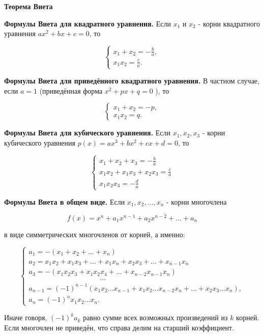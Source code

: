 \centerline{\bf \Huge Теорема Виета}


\textbf{Формулы Виета для квадратного уравнения.}
Если $x_1$ и $x_2$ - корни квадратного уравнения $a x^2+b x+c=0$, то

$$
\left\{\begin{array}{l}
x_1+x_2=-\frac{b}{a}, \\
x_1 x_2=\frac{c}{a} .
\end{array}\right.
$$


\textbf{Формулы Виета для приведённого квадратного уравнения.}
В частном случае, если $a=1$ (приведённая форма $x^2+p x+q=0$ ), то

$$
\left\{\begin{array}{l}
x_1+x_2=-p, \\
x_1 x_2=q .
\end{array}\right.
$$


\textbf{Формулы Виета для кубического уравнения.}
Если $x_1, x_2, x_3$ - корни кубического уравнения $p(x)=a x^3+b x^2+c x+d=0$, то

$$
\left\{\begin{array}{l}
x_1+x_2+x_3=-\frac{b}{a} \\
x_1 x_2+x_1 x_3+x_2 x_3=\frac{c}{a} \\
x_1 x_2 x_3=-\frac{d}{a}
\end{array}\right.
$$

\textbf{Формулы Виета в общем виде.}
Если $x_1, x_2, \ldots, x_n$ - корни многочлена

$$f(x)=x^n+a_1 x^{n-1}+a_2 x^{n-2}+\ldots+a_n$$

в виде симметрических многочленов от корней, а именно:

$$
\left\{\begin{array}{l}
a_1=-\left(x_1+x_2+\ldots+x_n\right) \\
a_2 =x_1 x_2+x_1 x_3+\ldots+x_1 x_n+x_2 x_3+\ldots+x_{n-1} x_n \\
a_3 =-\left(x_1 x_2 x_3+x_1 x_2 x_4+\ldots+x_{n-2} x_{n-1} x_n\right)\\
\qquad\qquad\qquad\qquad\qquad \ldots\\
a_{n-1} =(-1)^{n-1}\left(x_1 x_2 \ldots x_{n-1}+x_1 x_2 \ldots x_{n-2} x_n+\ldots+x_2 x_3 \ldots x_n\right), \\
a_n =(-1)^n x_1 x_2 \ldots x_n .
\end{array}\right.
$$

Иначе говоря, $(-1)^k a_k$ равно сумме всех возможных произведений из $k$ корней. Если многочлен не приведён, что справа делим на старший коэффициент.


